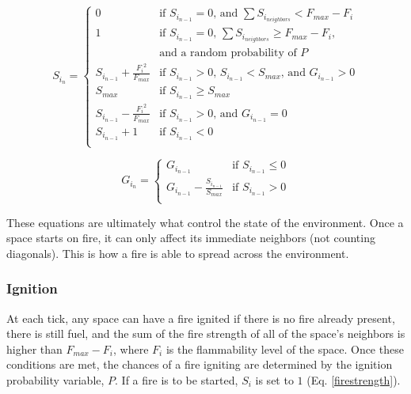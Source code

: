 \documentclass{article}
\begin{document}
  \begin{equation} \label{firestrength}
    S_{i_n} =
    \begin{cases}
      0 & \text{if $S_{i_{n-1}} = 0$, and $\sum{S_{i_{neighbors}}} < F_{max} - F_i$} \\
      1 & \text{if $S_{i_{n-1}} = 0$, $\sum{S_{i_{neighbors}}} \geq F_{max} - F_i$,} \\
        & \text{and a random probability of $P$} \\
      S_{i_{n-1}} + \frac{{F_i}^2}{F_{max}} & \text{if $S_{i_{n-1}} > 0$, $S_{i_{n-1}} < S_{max}$, and $G_{i_{n-1}} > 0$} \\
      S_{max} & \text{if $S_{i_{n-1}} \geq S_{max}$} \\
      S_{i_{n-1}} - \frac{{F_i}^2}{F_{max}} & \text{if $S_{i_{n-1}} > 0$, and $G_{i_{n-1}} = 0$} \\
      S_{i_{n-1}} + 1 & \text{if $S_{i_{n-1}} < 0$} \\
    \end{cases}
  \end{equation}

  \begin{equation} \label{fuellevel}
    G_{i_n} =
    \begin{cases}
      G_{i_{n-1}} & \text{if $S_{i_{n-1}} \leq 0$} \\
      G_{i_{n-1}} - \frac{S_{i_{n-1}}}{S_{max}} & \text{if $S_{i_{n-1}} > 0$} \\
    \end{cases}
  \end{equation}

  These equations are ultimately what control the state of the environment.
  Once a space starts on fire, it can only affect its immediate neighbors
  (not counting diagonals).  This is how a fire is able to spread across the
  environment.

  \subsubsection*{Ignition}

  At each tick, any space can have a fire ignited if there is no fire already present,
  there is still fuel, and the sum of the fire strength of all of the space's
  neighbors is higher than $F_{max} - F_i$, where $F_i$ is the flammability
  level of the space.  Once these conditions are met,
  the chances of a fire igniting are determined by the ignition probability
  variable, $P$.  If a fire is to be started, $S_i$ is set to $1$
  (Eq. \ref{firestrength}).
\end{document}
